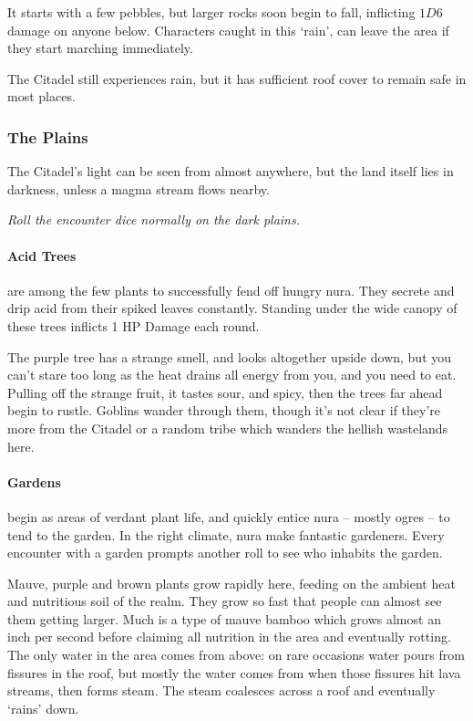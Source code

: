 \begin{multicols}{2}
It starts with a few pebbles, but larger rocks soon begin to fall, inflicting $1D6$ damage on anyone below.
Characters caught in this `rain', can leave the area if they start marching immediately.

The Citadel still experiences rain, but it has sufficient roof cover to remain safe in most places.

\subsubsection{The Plains}

The Citadel's light can be seen from almost anywhere, but the land itself lies in darkness, unless a magma stream flows nearby.

\textit{Roll the encounter dice normally on the dark plains.}

\paragraph{Acid Trees}
are among the few plants to successfully fend off hungry nura.
They secrete and drip acid from their spiked leaves constantly.
Standing under the wide canopy of these trees inflicts 1 HP Damage each round.

\begin{boxtext}

  The purple tree has a strange smell, and looks altogether upside down, but you can't stare too long as the heat drains all energy from you, and you need to eat.
Pulling off the strange fruit, it tastes sour, and spicy, then the trees far ahead begin to rustle.
Goblins wander through them, though it's not clear if they're more from the Citadel or a random tribe which wanders the hellish wastelands here.

\end{boxtext}

\paragraph{Gardens}
begin as areas of verdant plant life, and quickly entice nura -- mostly ogres -- to tend to the garden.
In the right climate, nura make fantastic gardeners.
Every encounter with a garden prompts another roll to see who inhabits the garden.

Mauve, purple and brown plants grow rapidly here, feeding on the ambient heat and nutritious soil of the realm.
They grow so fast that people can almost see them getting larger.
Much is a type of mauve bamboo which grows almost an inch per second before claiming all nutrition in the area and eventually rotting.
The only water in the area comes from above: on rare occasions water pours from fissures in the roof, but mostly the water comes from when those fissures hit lava streams, then forms steam.
The steam coalesces across a roof and eventually `rains' down.


\end{multicols}
